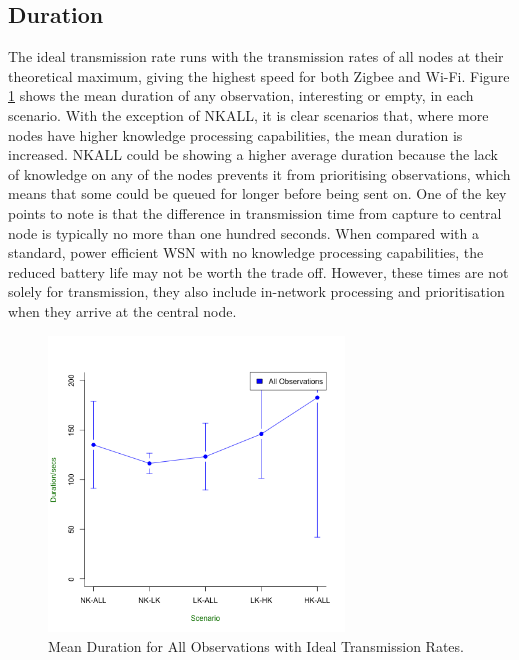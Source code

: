 \subsection{Duration}
The ideal transmission rate runs with the transmission rates of all nodes at their theoretical maximum, giving the highest speed for both Zigbee and Wi-Fi. Figure \ref{fig:res:ideal:dur} shows the mean duration of any observation, interesting or empty, in each scenario. With the exception of NKALL, it is clear scenarios that, where more nodes have higher knowledge processing capabilities, the mean duration is increased. NKALL could be showing a higher average duration because the lack of knowledge on any of the nodes prevents it from prioritising observations, which means that some could be queued for longer before being sent on. One of the key points to note is that the difference in transmission time from capture to central node is typically no more than one hundred seconds. When compared with a standard, power efficient WSN with no knowledge processing capabilities, the reduced battery life may not be worth the trade off. However, these times are not solely for transmission, they also include in-network processing and prioritisation when they arrive at the central node. 

	\begin{figure}[h]
	\centering
	\includegraphics[width=0.70\textwidth]{Chap7/figures/ideal_all_dur}
	\caption{Mean Duration for All Observations with Ideal Transmission Rates.}
	\label{fig:res:ideal:dur}
	\end{figure}
	
